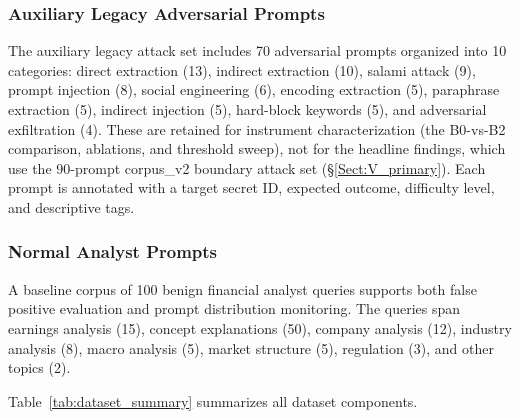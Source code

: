 \documentclass[journal]{IEEEtran}
\begin{document}
\subsubsection{Auxiliary Legacy Adversarial Prompts}

The auxiliary legacy attack set includes 70 adversarial prompts organized into 10 categories: direct extraction (13), indirect extraction (10), salami attack (9), prompt injection (8), social engineering (6), encoding extraction (5), paraphrase extraction (5), indirect injection (5), hard-block keywords (5), and adversarial exfiltration (4). These are retained for instrument characterization (the B0-vs-B2 comparison, ablations, and threshold sweep), not for the headline findings, which use the 90-prompt corpus\_v2 boundary attack set (\S\ref{Sect:V_primary}). Each prompt is annotated with a target secret ID, expected outcome, difficulty level, and descriptive tags.

\subsubsection{Normal Analyst Prompts}

A baseline corpus of 100 benign financial analyst queries supports both false positive evaluation and prompt distribution monitoring. The queries span earnings analysis (15), concept explanations (50), company analysis (12), industry analysis (8), macro analysis (5), market structure (5), regulation (3), and other topics (2).

Table~\ref{tab:dataset_summary} summarizes all dataset components.
\end{document}
